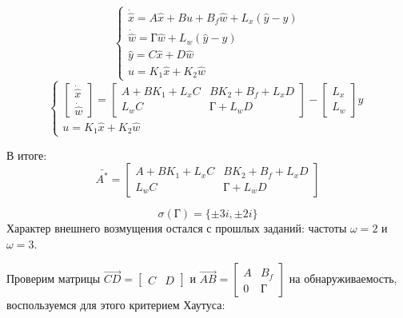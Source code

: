 $$
  \begin{cases}
    \dot{\hat{x}} = A \hat{x} + Bu + B_f \hat{w} + L_x (\hat{y} - y) \\
    \dot{\hat{w}} = \text{Г} \hat{w} + L_w (\hat{y} - y) \\
    \hat{y} = C\hat{x} + D \hat{w} \\
    u = K_1 \hat{x} + K_2 \hat{w}
  \end{cases}
$$
$$
  \begin{cases}
    \begin{bmatrix}
      \dot{\hat{x}} \\ \dot{\hat{w}} 
    \end{bmatrix} = 
                    \begin{bmatrix}
                      A + B K_1 +L_x C & B K_2 + B_f + L_x D \\
                      L_w C            &  \text{Г} + L_w D
                    \end{bmatrix} - \begin{bmatrix}
                      L_x \\ L_w
                    \end{bmatrix} y \\
    u = K_1 \hat{x} + K_2 \hat{w}
  \end{cases}
$$


В итоге:
$$
  \bar{A^*} = \begin{bmatrix}
                A + B K_1 +L_x C & B K_2 + B_f + L_x D \\
                L_w C            &  \text{Г} + L_w D
              \end{bmatrix}
$$

$$
  \sigma(\text{Г}) = \{ \pm 3i, \pm 2i \}
$$
Характер внешнего возмущения остался с прошлых заданий: частоты $\omega = 2$ и $\omega = 3$.

Проверим матрицы $\vec{CD} =\begin{bmatrix} C & D \end{bmatrix}$ и $\vec{AB} = \begin{bmatrix} A & B_f \\ 0 & \text{Г} \end{bmatrix}$ 
на обнаруживаемость, воспользуемся для этого критерием Хаутуса:

